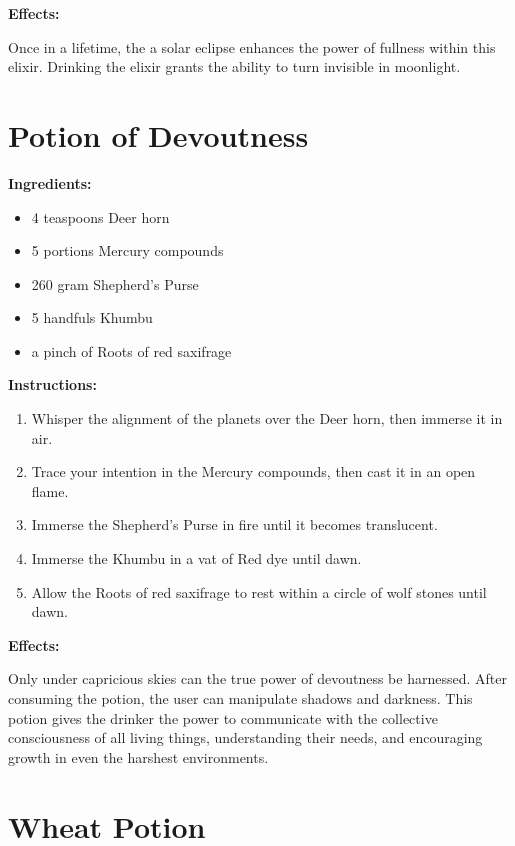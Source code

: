 \documentclass{article}
\begin{document}
\textbf{Effects:}

Once in a lifetime, the a solar eclipse enhances the power of fullness within this elixir. Drinking the elixir grants the ability to turn invisible in moonlight.

\newpage
\section*{Potion of Devoutness}

\textbf{Ingredients:}

\begin{itemize}
  \item 4 teaspoons Deer horn
  \item 5 portions Mercury compounds
  \item 260 gram Shepherd's Purse
  \item 5 handfuls Khumbu
  \item a pinch of Roots of red saxifrage
\end{itemize}

\textbf{Instructions:}

\begin{enumerate}
  \item Whisper the alignment of the planets over the Deer horn, then immerse it in air.
  \item Trace your intention in the Mercury compounds, then cast it in an open flame.
  \item Immerse the Shepherd's Purse in fire until it becomes translucent.
  \item Immerse the Khumbu in a vat of Red dye until dawn.
  \item Allow the Roots of red saxifrage to rest within a circle of wolf stones until dawn.
\end{enumerate}

\textbf{Effects:}

Only under capricious skies can the true power of devoutness be harnessed. After consuming the potion, the user can manipulate shadows and darkness. This potion gives the drinker the power to communicate with the collective consciousness of all living things, understanding their needs, and encouraging growth in even the harshest environments.

\newpage
\section*{Wheat Potion}
\end{document}
